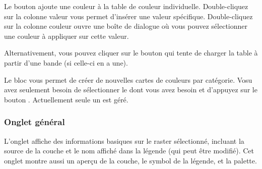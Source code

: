 Le bouton  ajoute une couleur à la table de couleur
individuelle. Double-cliquez sur la colonne valeur vous permet d'insérer une
valeur spécifique. Double-cliquez sur la colonne couleur ouvre une boîte de
dialogue   où vous pouvez sélectionner une
couleur à appliquer sur cette valeur.

Alternativement, vous pouvez cliquer sur le bouton
  qui tente de charger la table à partir d'une bande (si celle-ci en a
une).

Le bloc  vous permet de
créer de nouvelles cartes de couleurs par catégorie. Vosu avez seulement besoin
de sélectionner le  dont vous avez besoin
et d'appuyez sur le bouton . Actuellement seule un 
 est géré.

\subsubsection{Onglet général}\label{label_generaltab}

L'onglet  affiche des informations basiques sur le raster
sélectionné, incluant la source de la couche et le nom affiché dans la légende
(qui peut être modifié). Cet onglet montre aussi un aperçu de la couche, le
symbol de la légende, et la palette.

